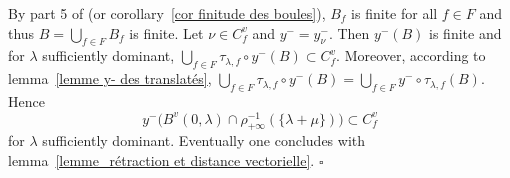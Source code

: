 \documentclass[12pt]{article}
\theoremstyle{plain}
\theoremstyle{definition}
\begin{document}
By part 5 of \cite{gaussent2014spherical} (or corollary~\ref{cor finitude des boules}), $B_f$ is finite for all $f\in F$ and thus $B=\bigcup_{f\in F}B_f$ is finite.  Let $\nu\in C_f^v$ and $y^-=y_\nu^-$. Then $y^-(B)$ is finite and for $\lambda$ sufficiently dominant, $\bigcup_{f\in F}\tau_{\lambda,f}\circ y^-(B) \subset{C^v_f}$. Moreover, according to lemma~\ref{lemme y- des translatés}, $\bigcup_{f\in F}\tau_{\lambda,f}\circ y^-(B)=\bigcup_{f\in F}y^-\circ \tau_{\lambda,f}(B)$. Hence \[y^-\big(B^v(0,\lambda)\cap \rho_{+\infty}^{-1}(\{\lambda+\mu\})\big)\subset C^v_f\] for $\lambda$ sufficiently dominant. Eventually one concludes with lemma~\ref{lemme_rétraction et distance vectorielle}. $\square$




 


 
\end{document}
